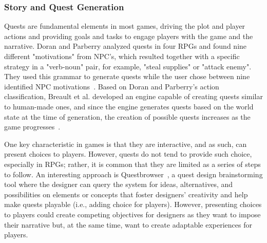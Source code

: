 \subsubsection{Story and Quest Generation}

Quests are fundamental elements in most games, driving the plot and player actions and providing goals and tasks to engage players with the game and the narrative. Doran and Parberry analyzed quests in four RPGs and found nine different "motivations" from NPC's, which resulted together with a specific strategy in a "verb-noun" pair, for example, "steal supplies" or "attack enemy". They used this grammar to generate quests while the user chose between nine identified NPC motivations~\cite{p8Doran2011-questsMMORPGs}. Based on Doran and Parberry's action classification, Breault et al. developed an engine capable of creating quests similar to human-made ones, and since the engine generates quests based on the world state at the time of generation, the creation of possible quests increases as the game progresses~\cite{p8Breault2021-CONANQuestGen}. 

One key characteristic in games is that they are interactive, and as such, can present choices to players. However, quests do not tend to provide such choice, especially in RPGs; rather, it is common that they are limited as a series of steps to follow.  An interesting approach is Questbrowser~\cite{p8Sullivan2009-questbrowser}, a quest design brainstorming tool where the designer can query the system for ideas, alternatives, and possibilities on elements or concepts that foster designers' creativity and help make quests playable (i.e., adding choice for players). However, presenting choices to players could create competing objectives for designers as they want to impose their narrative but, at the same time, want to create adaptable experiences for players. %

